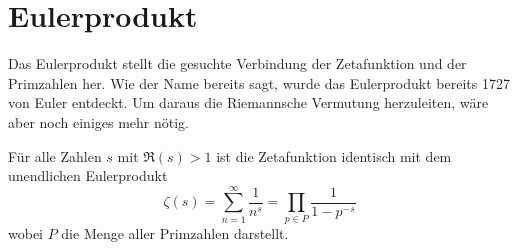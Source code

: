 \section{Eulerprodukt} \label{zeta:section:eulerprodukt}

Das Eulerprodukt stellt die gesuchte Verbindung der Zetafunktion und der Primzahlen her.
Wie der Name bereits sagt, wurde das Eulerprodukt bereits 1727 von Euler entdeckt.
Um daraus die Riemannsche Vermutung herzuleiten, wäre aber noch einiges mehr nötig.

\begin{satz}
    Für alle Zahlen $s$ mit $\Re(s) > 1$ ist die Zetafunktion identisch mit dem unendlichen Eulerprodukt
    \begin{equation}\label{zeta:eq:eulerprodukt}
        \zeta(s)
        =
        \sum_{n=1}^\infty
        \frac{1}{n^s}
        =
        \prod_{p \in P}
        \frac{1}{1-p^{-s}}
    \end{equation}
    wobei $P$ die Menge aller Primzahlen darstellt.
\end{satz}

